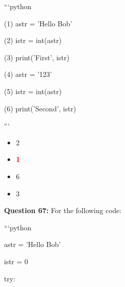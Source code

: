 \documentclass[12pt,a4paper]{article}
\begin{document}
\newline
```python\newline

\newline
(1)  astr = 'Hello Bob'\newline

\newline
(2)  istr = int(astr)\newline

\newline
(3)  print('First', istr)\newline

\newline
(4)  astr = '123'\newline

\newline
(5)  istr = int(astr)\newline

\newline
(6)  print('Second', istr)\newline

\newline
```

\begin{itemize}
    \item[\textbf{A.}] 2
    \item[\textbf{B.}] \textcolor{red}{\textbf{1}}
    \item[\textbf{C.}] 6
    \item[\textbf{D.}] 3
\end{itemize}

\vspace{0.5cm}

\textbf{Question 67:} For the following code:\newline

\newline
\newline

\newline
```python\newline

\newline
astr = 'Hello Bob'\newline

\newline
istr = 0\newline

\newline
try:\newline
\end{document}
